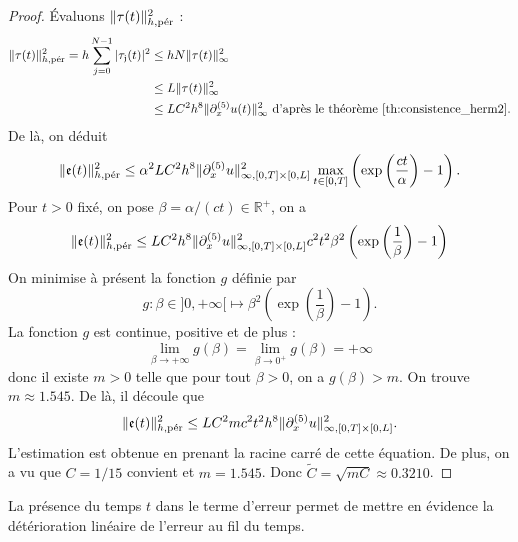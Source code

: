 \begin{proof}
Évaluons $\| \tau(t) \|_{h,\per}^2$ :
\begin{align*}
\|\mathfrak{\tau}(t)\|_{h,\per}^2 = h \gsum_{j=0}^{N-1} |\mathfrak{\tau_j}(t)|^2 & \leq h N \|\mathfrak{\tau}(t)\|_{\infty}^2 \\
	& \leq  L \|\mathfrak{\tau}(t)\|_{\infty}^2 \\
	& \leq L C^2 h^8  \| \partial_x^{(5)} u(t) \|_{\infty}^2 \text{ d'après le théorème \ref{th:consistence_herm2}.}
\end{align*}
De là, on déduit
\begin{equation}
\|\mathfrak{e}(t)\|_{h,\per}^2 \leq \alpha^2 L C^2 h^8  \| \partial_x^{(5)} u \|_{\infty,[0,T] \times [0,L]}^2 \max_{t \in [0,T]} \left( \exp \left( \dfrac{ct}{\alpha} \right) -1  \right).
\end{equation}
Pour $t>0$ fixé, on pose $\beta = \alpha/(ct) \in \mathbb{R}^+$, on a 
\begin{equation}
\|\mathfrak{e}(t)\|_{h,\per}^2 \leq L C^2 h^8  \| \partial_x^{(5)} u \|_{\infty,[0,T] \times [0,L]}^2 c^2 t^2 \beta^2 \left( \exp \left( \dfrac{1}{\beta} \right) -1  \right)
\end{equation}
On minimise à présent la fonction $g$ définie par
\begin{equation}
g :\beta \in ]0 , + \infty[ \mapsto \beta^2 \left( \exp \left( \dfrac{1}{\beta} \right) -1  \right).
\end{equation}
La fonction $g$ est continue, positive et de plus :
\begin{equation}
\lim_{\beta \rightarrow + \infty} g(\beta) = \lim_{\beta \rightarrow 0^+} g(\beta) = + \infty
\end{equation}
donc il existe $m > 0$ telle que pour tout $\beta > 0$, on a $g(\beta)>m$. On trouve $m \approx 1.545$. De là, il découle que
\begin{equation*}
\|\mathfrak{e}(t)\|_{h,\per}^2 \leq L C^2 m c^2 t^2 h^8  \| \partial_x^{(5)} u \|_{\infty,[0,T] \times [0,L]}^2.
\end{equation*}
L'estimation est obtenue en prenant la racine carré de cette équation. De plus, on a vu que $C = 1/15$ convient et $m=1.545$. Donc $\tilde{C} = \sqrt{mC} \approx 0.3210$.
\end{proof}

La présence du temps $t$ dans le terme d'erreur permet de mettre en évidence la détérioration linéaire de l'erreur au fil du temps. 

